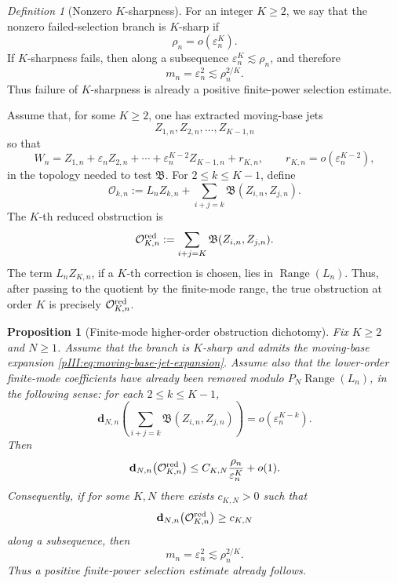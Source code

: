\documentclass[11pt]{article}
\numberwithin{equation}{section}
\theoremstyle{plain}
\newtheorem{proposition}{Proposition}[section]
\theoremstyle{definition}
\theoremstyle{remark}
\newtheorem{definition}{Definition}[section]
\DeclareMathOperator{\Range}{Range}
\newcommand{\calB}{\mathfrak B}
\begin{document}
\begin{definition}[Nonzero \(K\)-sharpness]
\label{pIII:def:K-sharpness-nonzero}
For an integer \(K\ge2\), we say that the nonzero failed-selection branch is \(K\)-sharp if
\[
        \rho_n=o(\varepsilon_n^K).
\]
If \(K\)-sharpness fails, then along a subsequence \(\varepsilon_n^K\lesssim \rho_n\), and therefore
\[
        m_n=\varepsilon_n^2\lesssim \rho_n^{2/K}.
\]
Thus failure of \(K\)-sharpness is already a positive finite-power selection estimate.
\end{definition}

Assume that, for some \(K\ge2\), one has extracted moving-base jets
\[
        Z_{1,n},Z_{2,n},\ldots,Z_{K-1,n}
\]
so that
\begin{equation}\label{pIII:eq:moving-base-jet-expansion}
        W_n
        =
        Z_{1,n}+\varepsilon_nZ_{2,n}+\cdots+
        \varepsilon_n^{K-2}Z_{K-1,n}+r_{K,n},
        \qquad
        r_{K,n}=o(\varepsilon_n^{K-2}),
\end{equation}
in the topology needed to test \(\calB\).  For \(2\le k\le K-1\), define
\begin{equation}\label{pIII:eq:Ok-moving-base}
        \mathcal O_{k,n}
        :=
        L_nZ_{k,n}
        +
        \sum_{i+j=k}\calB(Z_{i,n},Z_{j,n}).
\end{equation}
The \(K\)-th reduced obstruction is
\begin{equation}\label{pIII:eq:OK-red-moving-base}
        \mathcal O^{\rm red}_{K,n}
        :=
        \sum_{i+j=K}\calB(Z_{i,n},Z_{j,n}).
\end{equation}
The term \(L_nZ_{K,n}\), if a \(K\)-th correction is chosen, lies in \(\Range(L_n)\).  Thus, after
passing to the quotient by the finite-mode range, the true obstruction at order \(K\) is precisely
\(\mathcal O^{\rm red}_{K,n}\).

\begin{proposition}[Finite-mode higher-order obstruction dichotomy]
\label{pIII:prop:finite-mode-higher-order-obstruction}
Fix \(K\ge2\) and \(N\ge1\).  Assume that the branch is \(K\)-sharp and admits the moving-base
expansion \eqref{pIII:eq:moving-base-jet-expansion}.  Assume also that the lower-order finite-mode
coefficients have already been removed modulo \(P_N\Range(L_n)\), in the following sense: for each
\(2\le k\le K-1\),
\begin{equation}\label{pIII:eq:lower-order-removed}
        \mathbf d_{N,n}
        \left(
        \sum_{i+j=k}\calB(Z_{i,n},Z_{j,n})
        \right)
        =
        o(\varepsilon_n^{K-k}).
\end{equation}
Then
\begin{equation}\label{pIII:eq:finite-mode-K-bound}
        \mathbf d_{N,n}\bigl(\mathcal O^{\rm red}_{K,n}\bigr)
        \le
        C_{K,N}\frac{\rho_n}{\varepsilon_n^K}+o(1).
\end{equation}
Consequently, if for some \(K,N\) there exists \(c_{K,N}>0\) such that
\[
        \mathbf d_{N,n}\bigl(\mathcal O^{\rm red}_{K,n}\bigr)
        \ge c_{K,N}
\]
along a subsequence, then
\[
        m_n=\varepsilon_n^2\lesssim \rho_n^{2/K}.
\]
Thus a positive finite-power selection estimate already follows.
\end{proposition}
\end{document}
